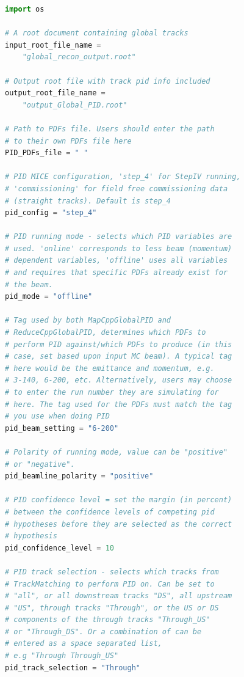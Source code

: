 \begin{lstlisting}[language=Python,basicstyle=\ttfamily,breaklines=true,frame=single,captionpos=b,caption={An example datacard (example\_pid\_datacard.py) for use with GlobalPID.py},label=piddatacard]
import os

# A root document containing global tracks
input_root_file_name = 
	"global_recon_output.root"

# Output root file with track pid info included
output_root_file_name = 
	"output_Global_PID.root"

# Path to PDFs file. Users should enter the path
# to their own PDFs file here
PID_PDFs_file = " "

# PID MICE configuration, 'step_4' for StepIV running,
# 'commissioning' for field free commissioning data
# (straight tracks). Default is step_4
pid_config = "step_4"

# PID running mode - selects which PID variables are
# used. 'online' corresponds to less beam (momentum)
# dependent variables, 'offline' uses all variables 
# and requires that specific PDFs already exist for
# the beam.
pid_mode = "offline"

# Tag used by both MapCppGlobalPID and
# ReduceCppGlobalPID, determines which PDFs to
# perform PID against/which PDFs to produce (in this
# case, set based upon input MC beam). A typical tag
# here would be the emittance and momentum, e.g.
# 3-140, 6-200, etc. Alternatively, users may choose
# to enter the run number they are simulating for
# here. The tag used for the PDFs must match the tag
# you use when doing PID
pid_beam_setting = "6-200"

# Polarity of running mode, value can be "positive"
# or "negative".
pid_beamline_polarity = "positive"

# PID confidence level = set the margin (in percent)
# between the confidence levels of competing pid
# hypotheses before they are selected as the correct
# hypothesis
pid_confidence_level = 10

# PID track selection - selects which tracks from
# TrackMatching to perform PID on. Can be set to
# "all", or all downstream tracks "DS", all upstream
# "US", through tracks "Through", or the US or DS
# components of the through tracks "Through_US"
# or "Through_DS". Or a combination of can be 
# entered as a space separated list,
# e.g "Through Through_US"
pid_track_selection = "Through"

\end{lstlisting}

